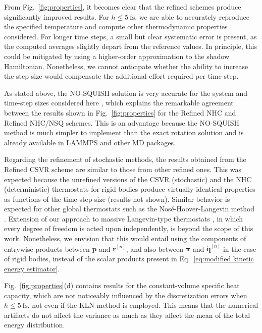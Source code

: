 \documentclass[
	aip,
	jcp,
	reprint,
]{revtex4-1}
\newcommand{\vt}[1]{\boldsymbol{\mathbf{#1}}}          %
\newcommand{\timestep}{h}
\begin{document}
From Fig.~\ref{fig:properties}, it becomes clear that the refined schemes produce significantly improved results. For $\timestep \leq 5~\mathrm{fs}$, we are able to accurately reproduce the specified temperature and compute other thermodynamic properties considered.
For longer time steps, a small but clear systematic error is present, as the computed averages slightly depart from the reference values.
In principle, this could be mitigated by using a higher-order approximation to the shadow Hamiltonian.
Nonetheless, we cannot anticipate whether the ability to increase the step size would compensate the additional effort required per time step.

As stated above, the NO-SQUISH solution \cite{Dullweber_1997, Miller_2002} is very accurate for the system and time-step sizes considered here \cite{Silveira_2017},
which explains the remarkable agreement between the results shown in Fig.~\ref{fig:properties} for the Refined NHC and Refined NHC/NSQ schemes.
This is an advantage because the NO-SQUISH method is much simpler to implement than the exact rotation solution and is already available in LAMMPS \cite{Plimpton_1995} and other MD packages.

Regarding the refinement of stochastic methods, the results obtained from the Refined CSVR scheme are similar to those from other refined ones.
This was expected because the unrefined versions of the CSVR \cite{Bussi_2007} (stochastic) and the NHC \cite{Martyna_1996} (deterministic) thermostats for rigid bodies produce virtually identical properties as functions of the time-step size (results not shown).
Similar behavior is expected for other global thermostats such as the Nos\'{e}-Hoover-Langevin method \cite{Samoletov_2007, Leimkuhler_2009}.
Extension of our approach to massive Langevin-type thermostats \cite{Brunger_1984, Davidchack_2009, Davidchack_2015}, in which every degree of freedom is acted upon independently, is beyond the scope of this work.
Nonetheless, we envision that this would entail using the components of entrywise products between $\vt p$ and $\dot{\vt r}^{[n]}$, and also between ${\vt \pi}$ and $\dot{\vt q}^{[n]}$ in the case of rigid bodies, instead of the scalar products present in Eq.~\eqref{eq:modified kinetic energy estimator}.

Fig.~\ref{fig:properties}(d) contains results for the constant-volume specific heat capacity, which
are not noticeably influenced by the discretization errors when $\timestep \leq 5~\mathrm{fs}$, not even if the KLN method is employed.
This means that the numerical artifacts do not affect the variance as much as they affect the mean of the total energy distribution.
\end{document}
